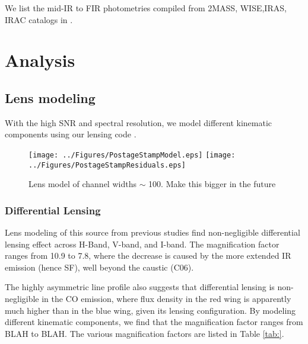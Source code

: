\documentclass[]{emulateapj}
\begin{document}
We list the mid-IR to FIR photometries compiled from 2MASS, WISE,IRAS, IRAC catalogs in .

\section{Analysis}
\subsection{Lens modeling}
With the high SNR and spectral resolution, we model different kinematic components using our lensing code \uvmcmcfit.





\begin{figure*}[tbph]
\centering
\texttt{[image: ../Figures/PostageStampModel.eps]}
\texttt{[image: ../Figures/PostageStampResiduals.eps]}
\caption{
Lens model of channel widths $\sim$ 100\kms.
Make this bigger in the future
\label{fig:}}
\end{figure*}



\subsubsection{Differential Lensing}
Lens modeling of this source from previous studies find non-negligible differential lensing effect across H-Band, V-band, and I-band. The magnification factor ranges from 10.9
to 7.8, where the decrease is caused
by the more extended IR emission (hence SF), well beyond the caustic (C06).

The highly asymmetric \bco line profile also suggests that differential lensing is non-negligible in the CO emission, where
flux density in the red wing is apparently much higher than in the blue wing, given its lensing configuration.
By modeling different kinematic components, we find that the magnification factor ranges from BLAH to BLAH. The various magnification factors are listed in Table \ref{tab:}.

\end{document}
